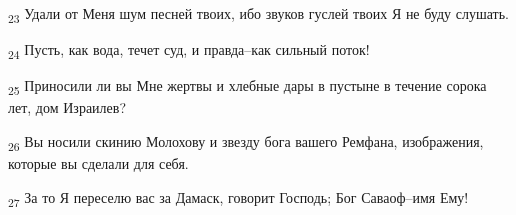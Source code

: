 \begin{tcolorbox}
\textsubscript{23} Удали от Меня шум песней твоих, ибо звуков гуслей твоих Я не буду слушать.
\end{tcolorbox}
\begin{tcolorbox}
\textsubscript{24} Пусть, как вода, течет суд, и правда--как сильный поток!
\end{tcolorbox}
\begin{tcolorbox}
\textsubscript{25} Приносили ли вы Мне жертвы и хлебные дары в пустыне в течение сорока лет, дом Израилев?
\end{tcolorbox}
\begin{tcolorbox}
\textsubscript{26} Вы носили скинию Молохову и звезду бога вашего Ремфана, изображения, которые вы сделали для себя.
\end{tcolorbox}
\begin{tcolorbox}
\textsubscript{27} За то Я переселю вас за Дамаск, говорит Господь; Бог Саваоф--имя Ему!
\end{tcolorbox}

